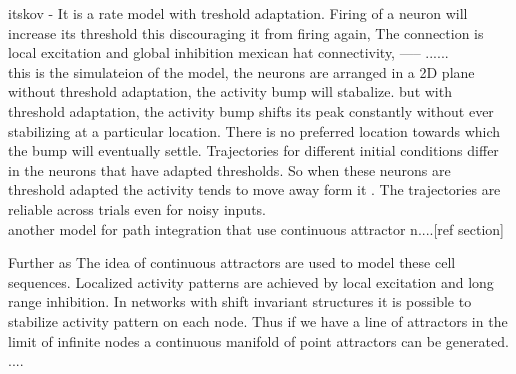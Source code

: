 itskov  - It is a rate model with treshold adaptation. Firing of a neuron will increase its threshold this discouraging it from firing again, The connection is local excitation and global inhibition mexican hat connectivity, ----- ......\\
this is the simulateion of the model, the neurons are arranged in a  2D plane without threshold adaptation, the activity bump will stabalize. but with threshold adaptation, the activity bump shifts its peak constantly without ever stabilizing at a particular location. There is no preferred location towards which the bump will eventually settle. Trajectories for different initial conditions differ in the neurons that have adapted thresholds. So when these neurons are threshold adapted the activity tends to move away form it . The trajectories are reliable across trials even for noisy inputs. \\ another model for path integration that use continuous attractor n....[ref section]

Further as 
The idea of continuous attractors are used to model these cell sequences. Localized activity patterns are achieved by local excitation and long range inhibition. In networks  with shift invariant structures it is possible to stabilize activity pattern on each node. Thus if we have a line of attractors in the limit of infinite nodes a continuous manifold of point attractors can be generated.  ....


